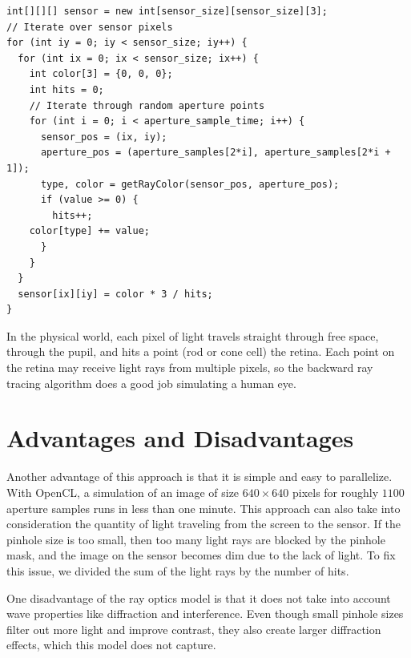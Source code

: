 
\begin{lstlisting}[frame=single, basicstyle=\footnotesize\ttfamily, columns=fullflexible, caption=Pseudocode For Ray Optics Simulation]
int[][][] sensor = new int[sensor_size][sensor_size][3];
// Iterate over sensor pixels
for (int iy = 0; iy < sensor_size; iy++) {
  for (int ix = 0; ix < sensor_size; ix++) {
    int color[3] = {0, 0, 0};
    int hits = 0;
    // Iterate through random aperture points
    for (int i = 0; i < aperture_sample_time; i++) {
      sensor_pos = (ix, iy);
      aperture_pos = (aperture_samples[2*i], aperture_samples[2*i + 1]);
      type, color = getRayColor(sensor_pos, aperture_pos);
      if (value >= 0) {
        hits++;
	color[type] += value;
      }
    }
  }
  sensor[ix][iy] = color * 3 / hits;
}
\end{lstlisting}

In the physical world, each pixel of light travels straight through free space, through the pupil, and hits a point (rod or cone cell) the retina. Each point on the retina may receive light rays from multiple pixels, so the backward ray tracing algorithm does a good job simulating a human eye. 

\section{Advantages and Disadvantages}

Another advantage of this approach is that it is simple and easy to parallelize. With OpenCL, a simulation of an image of size $640\times640$ pixels for roughly $1100$ aperture samples runs in less than one minute. This approach can also take into consideration the quantity of light traveling from the screen to the sensor. If the pinhole size is too small, then too many light rays are blocked by the pinhole mask, and the image on the sensor becomes dim due to the lack of light. To fix this issue, we divided the sum of the light rays by the number of hits. 

One disadvantage of the ray optics model is that it does not take into account wave properties like diffraction and interference. Even though small pinhole sizes filter out more light and improve contrast, they also create larger diffraction effects, which this model does not capture. 